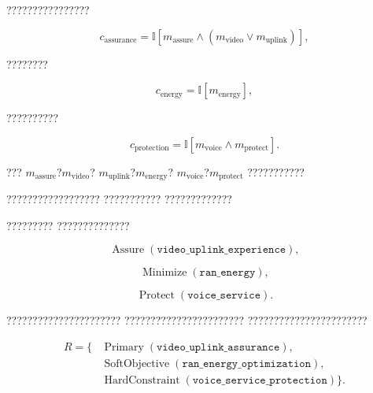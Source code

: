 ????????????????

\begin{equation}
c_{\mathrm{assurance}}
=
\mathbb{I}
\left[
m_{\mathrm{assure}}
\land
\left(
m_{\mathrm{video}}
\lor
m_{\mathrm{uplink}}
\right)
\right],
\label{eq:service_assurance_detection}
\end{equation}

????????

\begin{equation}
c_{\mathrm{energy}}
=
\mathbb{I}
\left[
m_{\mathrm{energy}}
\right],
\label{eq:energy_intent_detection}
\end{equation}

??????????

\begin{equation}
c_{\mathrm{protection}}
=
\mathbb{I}
\left[
m_{\mathrm{voice}}
\land
m_{\mathrm{protect}}
\right].
\label{eq:protection_intent_detection}
\end{equation}

???
$m_{\mathrm{assure}}$?$m_{\mathrm{video}}$?
$m_{\mathrm{uplink}}$?$m_{\mathrm{energy}}$?
$m_{\mathrm{voice}}$?$m_{\mathrm{protect}}$
???????????

??????????????????
???????????
?????????????

?????????
??????????????

\begin{equation}
\operatorname{Assure}
\left(
\texttt{video\_uplink\_experience}
\right),
\end{equation}

\begin{equation}
\operatorname{Minimize}
\left(
\texttt{ran\_energy}
\right),
\end{equation}

\begin{equation}
\operatorname{Protect}
\left(
\texttt{voice\_service}
\right).
\end{equation}

??????????????????????
???????????????????????
???????????????????????

\begin{equation}
\begin{aligned}
R
=
\{
&\operatorname{Primary}
(\texttt{video\_uplink\_assurance}),
\\
&\operatorname{SoftObjective}
(\texttt{ran\_energy\_optimization}),
\\
&\operatorname{HardConstraint}
(\texttt{voice\_service\_protection})
\}.
\end{aligned}
\label{eq:intent_logical_relationship}
\end{equation}

